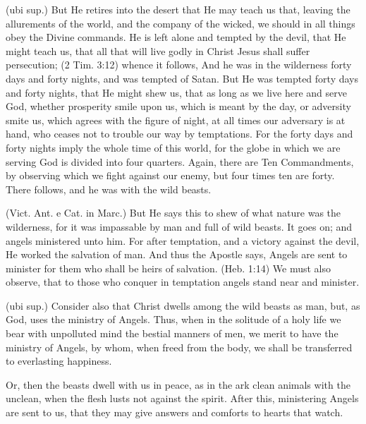  (ubi sup.) But He retires into the desert that He may teach us that, leaving the allurements of the world, and the company of the wicked, we should in all things obey the Divine commands. He is left alone and tempted by the devil, that He might teach us, that all that will live godly in Christ Jesus shall suffer persecution; (2 Tim. 3:12) whence it follows, And he was in the wilderness forty days and forty nights, and was tempted of Satan. But He was tempted forty days and forty nights, that He might shew us, that as long as we live here and serve God, whether prosperity smile upon us, which is meant by the day, or adversity smite us, which agrees with the figure of night, at all times our adversary is at hand, who ceases not to trouble our way by temptations. For the forty days and forty nights imply the whole time of this world, for the globe in which we are serving God is divided into four quarters. Again, there are Ten Commandments, by observing which we fight against our enemy, but four times ten are forty. There follows, and he was with the wild beasts.

 (Vict. Ant. e Cat. in Marc.) But He says this to shew of what nature was the wilderness, for it was impassable by man and full of wild beasts. It goes on; and angels ministered unto him. For after temptation, and a victory against the devil, He worked the salvation of man. And thus the Apostle says, Angels are sent to minister for them who shall be heirs of salvation. (Heb. 1:14) We must also observe, that to those who conquer in temptation angels stand near and minister.

 (ubi sup.) Consider also that Christ dwells among the wild beasts as man, but, as God, uses the ministry of Angels. Thus, when in the solitude of a holy life we bear with unpolluted mind the bestial manners of men, we merit to have the ministry of Angels, by whom, when freed from the body, we shall be transferred to everlasting happiness.

 Or, then the beasts dwell with us in peace, as in the ark clean animals with the unclean, when the flesh lusts not against the spirit. After this, ministering Angels are sent to us, that they may give answers and comforts to hearts that watch.

 

